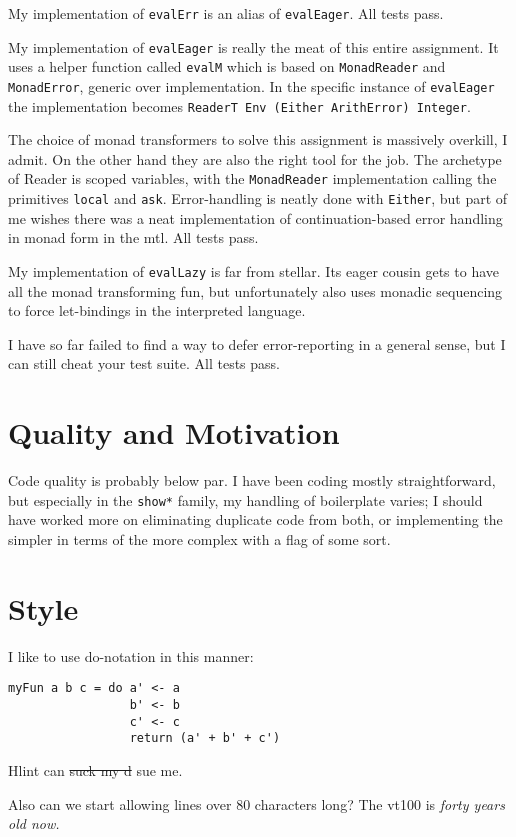 \documentclass[a4paper,article,oneside,10pt,twocolumn]{memoir}
\begin{document}
My implementation of \lstinline{evalErr} is an alias of \lstinline{evalEager}.
All tests pass.

My implementation of \lstinline{evalEager} is really the meat of this
entire assignment. It uses a helper function called \lstinline{evalM} which is based
on \lstinline{MonadReader} and \lstinline{MonadError}, generic over implementation. In
the specific instance of \lstinline{evalEager} the implementation becomes
\lstinline{ReaderT Env (Either ArithError) Integer}.

The choice of monad transformers to solve this assignment is massively overkill, I admit.
On the other hand they are also the right tool for the job. The archetype of Reader is scoped
variables, with the \lstinline{MonadReader} implementation calling the primitives \lstinline{local}
and \lstinline{ask}. Error-handling is neatly done with \lstinline{Either}, but part of
me wishes there was a neat implementation of continuation-based error handling in monad form
in the mtl. All tests pass.

My implementation of \lstinline{evalLazy} is far from stellar. Its eager
cousin gets to have all the monad transforming fun, but unfortunately also uses monadic
sequencing to force let-bindings in the interpreted language.

I have so far failed to find a way to defer error-reporting in a general sense, but I can
still cheat your test suite. All tests pass.

\section{Quality and Motivation}

Code quality is probably below par. I have been coding mostly straightforward, but
especially in the \lstinline{show*} family, my handling of boilerplate varies; I should have
worked more on eliminating duplicate code from both, or implementing the simpler in terms
of the more complex with a flag of some sort.

\section{Style}

I like to use do-notation in this manner:

\begin{lstlisting}
myFun a b c = do a' <- a
                 b' <- b
                 c' <- c
                 return (a' + b' + c')
\end{lstlisting}

Hlint can \sout{suck my d} sue me.

Also can we start allowing lines over 80 characters long?
The vt100 is \emph{forty years old now.}
\end{document}
